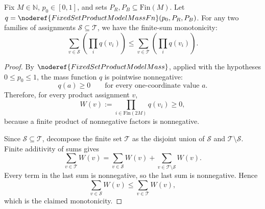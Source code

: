 \begin{helper}
Fix \(M\in\mathbb N\), \(p_0\in[0,1]\), and sets \(P_R, P_B\subseteq\mathrm{Fin}(M)\).
Let \(q=\noderef{FixedSetProductModelMassFn}(p_0, P_R, P_B)\).
For any two families of assignments \(\mathcal S\subseteq\mathcal T\), we have the finite-sum monotonicity:
\[
\sum_{v\in\mathcal S}\left(\prod_i q(v_i)\right) \le \sum_{v\in\mathcal T}\left(\prod_i q(v_i)\right).
\]
\end{helper}
\begin{proof}
By \(\noderef{FixedSetProductModelMass}\), applied with the hypotheses
\(0\le p_0\le1\), the mass function \(q\) is pointwise nonnegative:
\[
q(a)\ge0\qquad\text{for every one-coordinate value }a.
\]
Therefore, for every product assignment \(v\),
\[
W(v):=\prod_{i\in\mathrm{Fin}(2M)}q(v_i)\ge0,
\]
because a finite product of nonnegative factors is nonnegative.

Since \(\mathcal S\subseteq\mathcal T\), decompose the finite set
\(\mathcal T\) as the disjoint union of \(\mathcal S\) and
\(\mathcal T\setminus\mathcal S\).  Finite additivity of sums gives
\[
\sum_{v\in\mathcal T}W(v)
=
\sum_{v\in\mathcal S}W(v)
+
\sum_{v\in\mathcal T\setminus\mathcal S}W(v).
\]
Every term in the last sum is nonnegative, so the last sum is nonnegative.
Hence
\[
\sum_{v\in\mathcal S}W(v)\le \sum_{v\in\mathcal T}W(v),
\]
which is the claimed monotonicity.
\end{proof}
